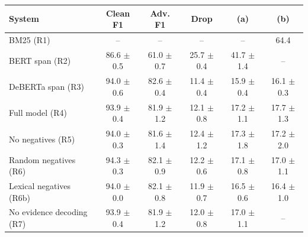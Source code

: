 \begin{tabular}{lccccc}
\hline
System & Clean F1 & Adv. F1 & Drop & (a) & (b) \\
\hline
BM25 (R1) & -- & -- & -- & -- & 64.4 \\
BERT span (R2) & 86.6 $\pm$ 0.5 & 61.0 $\pm$ 0.7 & 25.7 $\pm$ 0.4 & 41.7 $\pm$ 1.4 & -- \\
DeBERTa span (R3) & 94.0 $\pm$ 0.6 & 82.6 $\pm$ 0.4 & 11.4 $\pm$ 0.4 & 15.9 $\pm$ 0.4 & 16.1 $\pm$ 0.3 \\
Full model (R4) & 93.9 $\pm$ 0.4 & 81.9 $\pm$ 1.2 & 12.1 $\pm$ 0.8 & 17.2 $\pm$ 1.1 & 17.7 $\pm$ 1.3 \\
No negatives (R5) & 94.0 $\pm$ 0.3 & 81.6 $\pm$ 1.4 & 12.4 $\pm$ 1.2 & 17.3 $\pm$ 1.8 & 17.2 $\pm$ 2.0 \\
Random negatives (R6) & 94.3 $\pm$ 0.3 & 82.1 $\pm$ 0.9 & 12.2 $\pm$ 0.6 & 17.1 $\pm$ 0.8 & 17.0 $\pm$ 1.1 \\
Lexical negatives (R6b) & 94.0 $\pm$ 0.0 & 82.1 $\pm$ 0.8 & 11.9 $\pm$ 0.7 & 16.5 $\pm$ 0.6 & 16.4 $\pm$ 1.0 \\
No evidence decoding (R7) & 93.9 $\pm$ 0.4 & 81.9 $\pm$ 1.2 & 12.0 $\pm$ 0.8 & 17.0 $\pm$ 1.1 & -- \\
\hline
\end{tabular}
